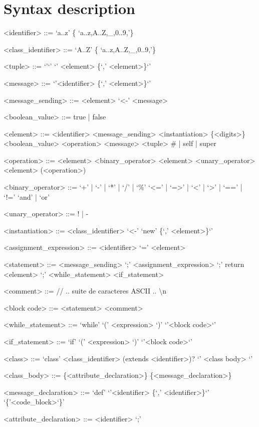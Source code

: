 \documentclass{eplDoc}
\begin{document}
\maketitle
\newpage

\section{Syntax description}

\begin{grammar}
<identifier> ::= `a..z' \{ `a..z,A..Z,\_,0..9,'\} 

<class\_identifier> ::= `A..Z' \{ `a..z,A..Z,\_,0..9,'\} 

<tuple> ::= `{'`}' \alt `{' <element> \{`,' <element>\}`}'

<message> ::= `{'<identifier> \{`,' <element>\}`}'

<message\_sending> ::= <element> `<-' <message>

<boolean\_value> ::= true | false

<element> ::= <identifier> 
\alt<message\_sending>
\alt<instantiation>
\alt \{<digits>\}
\alt <boolean\_value>
\alt <operation>
\alt <message>
\alt <tuple>
\alt # | self | super

<operation> ::= <element> <binary\_operator> <element>
\alt <unary\_operator> <element>
\alt (<operation>)

<binary\_operator> ::= `+' | `-' | `*' | `/' | `\%' 
\alt `<=' | `=>' | `<' | `>' | `==' | `!=' 
\alt `and' | `or'

<unary\_operator> ::= ! | - 

<instantiation> ::= <class\_identifier> `<-' `{new' \{`,' <element>\}`}'


<assignment\_expression> ::= <identifier> `=' <element>

<statement> ::= <message\_sending> `;'
\alt <assignment\_expression> `;'
\alt return <element> `;'
\alt <while\_statement>
\alt <if\_statement>

<comment> ::= // .. suite de caracteres ASCII .. \textbackslash n

<block code> ::= { <statement> } { <comment> } 

<while\_statement> ::= `while' `(' <expression> `)'  `{'<block code>`}'

<if\_statement> ::= `if' `(' <expression> `)'  `{'<block code>`}'




<class> ::= `class' <class\_identifier> (extends <identifier>)? `{' <class body> `}'

<class\_body> ::= \{<attribute\_declaration>\} \{<message\_declaration>\}

<message\_declaration> ::= `def'  `{'<identifier> \{`,' <identifier>\}`}' `\{'<code\_block>`\}'

<attribute\_declaration> ::= <identifier> `;'









\end{grammar}
\end{document}
